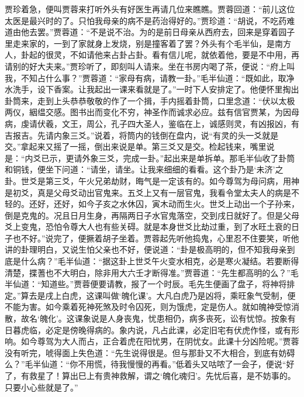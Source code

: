 \begin{parag}
    贾珍着急，便叫贾蓉来打听外头有好医生再请几位来瞧瞧。贾蓉回道：“前儿这位太医是最兴时的了。只怕我母亲的病不是药治得好的。”贾珍道：“胡说，不吃药难道由他去罢。”贾蓉道：“不是说不治。为的是前日母亲从西府去，回来是穿着园子里走来家的，一到了家就身上发烧，别是撞客着了罢？外头有个毛半仙，是南方人，卦起的很灵，不如请他来占卦占卦。看有信儿呢，就依着他，要是不中用，再请别的好大夫来。”贾珍听了，即刻叫人请来。坐在书房内喝了茶，便说：“府上叫我，不知占什么事？”贾蓉道：“家母有病，请教一卦。”毛半仙道：“既如此，取净水洗手，设下香案。让我起出一课来看就是了。”一时下人安排定了。他便怀里掏出卦筒来，走到上头恭恭敬敬的作了一个揖，手内摇着卦筒，口里念道：“伏以太极两仪，絪缊交感。图书出而变化不穷，神圣作而诚求必应。兹有信官贾某，为因母病，虔请伏羲，文王，周公，孔子四大圣人，鉴临在上，诚感则灵，有凶报凶，有吉报吉。先请内象三爻。”说着，将筒内的钱倒在盘内，说“有灵的头一爻就是交。”拿起来又摇了一摇，倒出来说是单。第三爻又是交。检起钱来，嘴里说是：“内爻已示，更请外象三爻，完成一卦。”起出来是单拆单。那毛半仙收了卦筒和铜钱，便坐下问道：“请坐，请坐。让我来细细的看看。这个卦乃是‘未济’之卦。世爻是第三爻，午火兄弟劫财，晦气是一定该有的。如今尊驾为母问病，用神是初爻，真是父母爻动出官鬼来。五爻上又有一层官鬼，我看令堂太夫人的病是不轻的。还好，还好，如今子亥之水休囚，寅木动而生火。世爻上动出一个子孙来，倒是克鬼的。况且日月生身，再隔两日子水官鬼落空，交到戌日就好了。但是父母爻上变鬼，恐怕令尊大人也有些关碍。就是本身世爻比劫过重，到了水旺土衰的日子也不好。”说完了，便撅着胡子坐着。贾蓉起先听他捣鬼，心里忍不住要笑，听他讲的卦理明白，又说生怕父亲也不好，便说道：“卦是极高明的，但不知我母亲到底是什么病？”毛半仙道：“据这卦上世爻午火变水相克，必是寒火凝结。若要断得清楚，揲蓍也不大明白，除非用大六壬才断得准。”贾蓉道：“先生都高明的么？”毛半仙道：“知道些。”贾蓉便要请教，报了一个时辰。毛先生便画了盘子，将神将排定。”算去是戌上白虎，这课叫做‘魄化课’。大凡白虎乃是凶将，乘旺象气受制，便不能为害。如今乘着死神死煞及时令囚死，则为饿虎，定是伤人。就如魄神受惊消散，故名‘魄化’。这课象说是人身丧鬼，忧患相仍，病多丧死，讼有忧惊。按象有日暮虎临，必定是傍晚得病的。象内说，凡占此课，必定旧宅有伏虎作怪，或有形响。如今尊驾为大人而占，正合着虎在阳忧男，在阴忧女。此课十分凶险呢。”贾蓉没有听完，唬得面上失色道：“先生说得很是。但与那卦又不大相合，到底有妨碍么？”毛半仙道：“你不用慌，待我慢慢的再看。”低着头又咕哝了一会子，便说“好了，有救星了！算出巳上有贵神救解，谓之‘魄化魂归’。先忧后喜，是不妨事的。只要小心些就是了。”
\end{parag}


